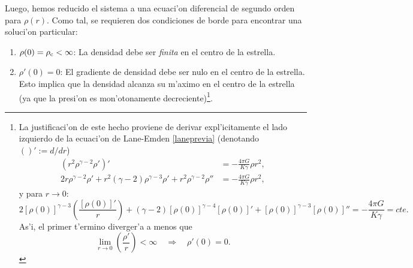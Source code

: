 Luego, hemos reducido el sistema a una ecuaci'on diferencial de segundo orden para $\rho(r)$. Como tal, se requieren dos condiciones de borde para encontrar una soluci'on particular:
\begin{enumerate}
\item $\rho(0)=\rho_{\rm c}<\infty$: La densidad debe ser \textit{finita} en el centro de la estrella.
\item $\rho'(0)=0$: El gradiente de densidad debe ser nulo en el centro de la estrella. Esto implica que la densidad alcanza su m'aximo en el centro de la estrella (ya que la presi'on es mon'otonamente decreciente)\footnote{La justificaci'on de este hecho proviene de derivar expl'icitamente el lado izquierdo de la ecuaci'on de Lane-Emden \eqref{laneprevia} (denotando $()':=d/dr$)
\begin{align}
\left(r^2\rho^{\gamma-2}\rho'\right)'&=-\frac{4\pi G}{K \gamma}\rho r^2,\\
 2r\rho^{\gamma-2}\rho'+r^2(\gamma-2)\rho^{\gamma-3}\rho'+r^2\rho^{\gamma-2}\rho''&=-\frac{4\pi G}{K \gamma}\rho r^2,
\end{align}
y para $r\to 0$:
\begin{equation}
2\left[\rho(0)\right]^{\gamma-3}\left(\frac{\left[\rho(0)\right]'}{r}\right)+(\gamma-2)\left[\rho(0)\right]^{\gamma-4}\left[\rho(0)\right]'
+\left[\rho(0)\right]^{\gamma-3}\left[\rho(0)\right]''=-\frac{4\pi G}{K \gamma}=cte.
\end{equation}
As'i, el primer t'ermino diverger'a a menos que
\begin{equation}\label{divergencia2}
 \lim_{r\to 0}\left(\frac{\rho'}{r}\right)<\infty\quad\Rightarrow\quad\rho'(0)=0.
\end{equation}}.
\end{enumerate}

